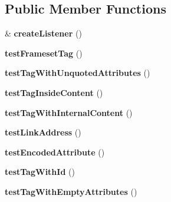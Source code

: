 \subsection*{Public Member Functions}
\begin{DoxyCompactItemize}
\item 
\hypertarget{class_test_of_html_sax_parser_ae469b78705bc0a660fca8a9fe72f71b1}{
\& {\bfseries createListener} ()}
\label{class_test_of_html_sax_parser_ae469b78705bc0a660fca8a9fe72f71b1}

\item 
\hypertarget{class_test_of_html_sax_parser_a03664b74f68eaa6791ebcde35e1caa38}{
{\bfseries testFramesetTag} ()}
\label{class_test_of_html_sax_parser_a03664b74f68eaa6791ebcde35e1caa38}

\item 
\hypertarget{class_test_of_html_sax_parser_a57b71a0bfb58184a21a462533020752e}{
{\bfseries testTagWithUnquotedAttributes} ()}
\label{class_test_of_html_sax_parser_a57b71a0bfb58184a21a462533020752e}

\item 
\hypertarget{class_test_of_html_sax_parser_aea09b106b63f7874be38a966150c9916}{
{\bfseries testTagInsideContent} ()}
\label{class_test_of_html_sax_parser_aea09b106b63f7874be38a966150c9916}

\item 
\hypertarget{class_test_of_html_sax_parser_a60b0253e88c8fe58b734228c66a10b4e}{
{\bfseries testTagWithInternalContent} ()}
\label{class_test_of_html_sax_parser_a60b0253e88c8fe58b734228c66a10b4e}

\item 
\hypertarget{class_test_of_html_sax_parser_a3e0c52252bf72ac1facf1eb29fc56306}{
{\bfseries testLinkAddress} ()}
\label{class_test_of_html_sax_parser_a3e0c52252bf72ac1facf1eb29fc56306}

\item 
\hypertarget{class_test_of_html_sax_parser_a6a1503f441bfa856dcd86e7639ff325a}{
{\bfseries testEncodedAttribute} ()}
\label{class_test_of_html_sax_parser_a6a1503f441bfa856dcd86e7639ff325a}

\item 
\hypertarget{class_test_of_html_sax_parser_a00ae34bd406acfaa72aa4e51e2091c14}{
{\bfseries testTagWithId} ()}
\label{class_test_of_html_sax_parser_a00ae34bd406acfaa72aa4e51e2091c14}

\item 
\hypertarget{class_test_of_html_sax_parser_af145c83cca222563c2535ba3bf673cd8}{
{\bfseries testTagWithEmptyAttributes} ()}
\label{class_test_of_html_sax_parser_af145c83cca222563c2535ba3bf673cd8}


\end{DoxyCompactItemize}
